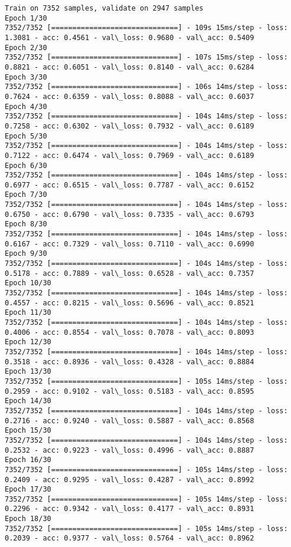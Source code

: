 \documentclass[11pt]{article}
\begin{document}
    \begin{Verbatim}[commandchars=\\\{\}]
Train on 7352 samples, validate on 2947 samples
Epoch 1/30
7352/7352 [==============================] - 109s 15ms/step - loss: 1.3081 - acc: 0.4561 - val\_loss: 0.9680 - val\_acc: 0.5409
Epoch 2/30
7352/7352 [==============================] - 107s 15ms/step - loss: 0.8821 - acc: 0.6051 - val\_loss: 0.8140 - val\_acc: 0.6284
Epoch 3/30
7352/7352 [==============================] - 106s 14ms/step - loss: 0.7624 - acc: 0.6359 - val\_loss: 0.8088 - val\_acc: 0.6037
Epoch 4/30
7352/7352 [==============================] - 104s 14ms/step - loss: 0.7258 - acc: 0.6302 - val\_loss: 0.7932 - val\_acc: 0.6189
Epoch 5/30
7352/7352 [==============================] - 104s 14ms/step - loss: 0.7122 - acc: 0.6474 - val\_loss: 0.7969 - val\_acc: 0.6189
Epoch 6/30
7352/7352 [==============================] - 104s 14ms/step - loss: 0.6977 - acc: 0.6515 - val\_loss: 0.7787 - val\_acc: 0.6152
Epoch 7/30
7352/7352 [==============================] - 104s 14ms/step - loss: 0.6750 - acc: 0.6790 - val\_loss: 0.7335 - val\_acc: 0.6793
Epoch 8/30
7352/7352 [==============================] - 104s 14ms/step - loss: 0.6167 - acc: 0.7329 - val\_loss: 0.7110 - val\_acc: 0.6990
Epoch 9/30
7352/7352 [==============================] - 104s 14ms/step - loss: 0.5178 - acc: 0.7889 - val\_loss: 0.6528 - val\_acc: 0.7357
Epoch 10/30
7352/7352 [==============================] - 104s 14ms/step - loss: 0.4557 - acc: 0.8215 - val\_loss: 0.5696 - val\_acc: 0.8521
Epoch 11/30
7352/7352 [==============================] - 104s 14ms/step - loss: 0.4006 - acc: 0.8554 - val\_loss: 0.7078 - val\_acc: 0.8093
Epoch 12/30
7352/7352 [==============================] - 104s 14ms/step - loss: 0.3518 - acc: 0.8936 - val\_loss: 0.4328 - val\_acc: 0.8884
Epoch 13/30
7352/7352 [==============================] - 105s 14ms/step - loss: 0.2959 - acc: 0.9102 - val\_loss: 0.5183 - val\_acc: 0.8595
Epoch 14/30
7352/7352 [==============================] - 104s 14ms/step - loss: 0.2716 - acc: 0.9240 - val\_loss: 0.5887 - val\_acc: 0.8568
Epoch 15/30
7352/7352 [==============================] - 104s 14ms/step - loss: 0.2532 - acc: 0.9223 - val\_loss: 0.4996 - val\_acc: 0.8887
Epoch 16/30
7352/7352 [==============================] - 105s 14ms/step - loss: 0.2409 - acc: 0.9295 - val\_loss: 0.4287 - val\_acc: 0.8992
Epoch 17/30
7352/7352 [==============================] - 105s 14ms/step - loss: 0.2296 - acc: 0.9342 - val\_loss: 0.4177 - val\_acc: 0.8931
Epoch 18/30
7352/7352 [==============================] - 105s 14ms/step - loss: 0.2039 - acc: 0.9377 - val\_loss: 0.5764 - val\_acc: 0.8962

\end{Verbatim}
\end{document}
